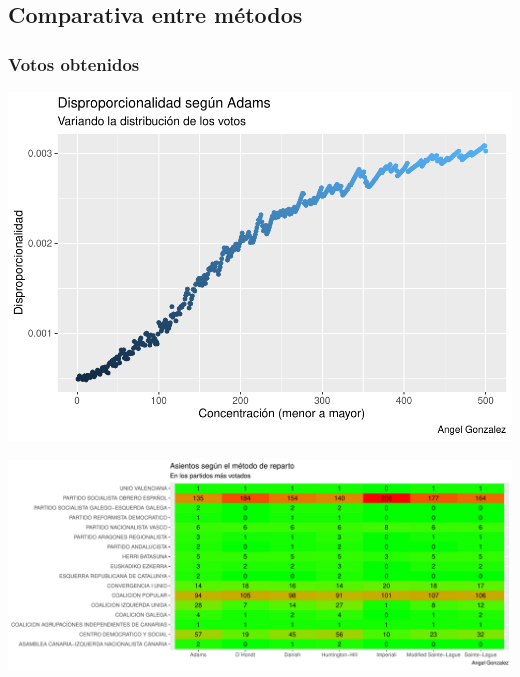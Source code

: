 \documentclass[12pt,a4paper,]{book}
\numberwithin{dummy}{section}
\theoremstyle{ocrenumbox}
\theoremstyle{blacknumex}
\theoremstyle{blacknumbox}
\theoremstyle{ocrenum}
\theoremstyle{ocrenum}
\begin{document}
\hypertarget{comparativa-entre-muxe9todos-3}{%
\subsection{Comparativa entre
métodos}\label{comparativa-entre-muxe9todos-3}}

\hypertarget{votos-obtenidos-3}{%
\subsubsection{Votos obtenidos}\label{votos-obtenidos-3}}

\begin{center}\includegraphics[width=0.95\linewidth]{figurasR/unnamed-chunk-38-1} \end{center}

\begin{center}\includegraphics[width=0.95\linewidth]{figurasR/unnamed-chunk-38-2} \end{center}
\end{document}
